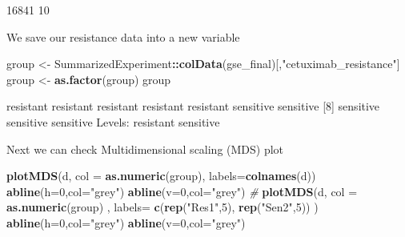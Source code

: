 \documentclass[
]{article}
\newenvironment{Shaded}{\begin{snugshade}}{\end{snugshade}}
\newcommand{\AttributeTok}[1]{\textcolor[rgb]{0.13,0.29,0.53}{#1}}
\newcommand{\CommentTok}[1]{\textcolor[rgb]{0.56,0.35,0.01}{\textit{#1}}}
\newcommand{\DecValTok}[1]{\textcolor[rgb]{0.00,0.00,0.81}{#1}}
\newcommand{\FunctionTok}[1]{\textcolor[rgb]{0.13,0.29,0.53}{\textbf{#1}}}
\newcommand{\NormalTok}[1]{#1}
\newcommand{\OtherTok}[1]{\textcolor[rgb]{0.56,0.35,0.01}{#1}}
\newcommand{\SpecialCharTok}[1]{\textcolor[rgb]{0.81,0.36,0.00}{\textbf{#1}}}
\newcommand{\StringTok}[1]{\textcolor[rgb]{0.31,0.60,0.02}{#1}}
\begin{document}
\begin{Shaded}
\begin{Highlighting}[]
\NormalTok{[1] 16841    10}
\end{Highlighting}
\end{Shaded}

We save our resistance data into a new variable

\begin{Shaded}
\begin{Highlighting}[]
\NormalTok{group }\OtherTok{\textless{}{-}}\NormalTok{ SummarizedExperiment}\SpecialCharTok{::}\FunctionTok{colData}\NormalTok{(gse\_final)[,}\StringTok{"cetuximab\_resistance"}\NormalTok{]}
\NormalTok{group }\OtherTok{\textless{}{-}} \FunctionTok{as.factor}\NormalTok{(group)}
\NormalTok{group}
\end{Highlighting}
\end{Shaded}

\begin{Shaded}
\begin{Highlighting}[]
\NormalTok{ [1] resistant resistant resistant resistant resistant sensitive sensitive}
\NormalTok{ [8] sensitive sensitive sensitive}
\NormalTok{Levels: resistant sensitive}
\end{Highlighting}
\end{Shaded}

Next we can check Multidimensional scaling (MDS) plot

\begin{Shaded}
\begin{Highlighting}[]
\FunctionTok{plotMDS}\NormalTok{(d, }\AttributeTok{col =} \FunctionTok{as.numeric}\NormalTok{(group), }\AttributeTok{labels=}\FunctionTok{colnames}\NormalTok{(d))}
\FunctionTok{abline}\NormalTok{(}\AttributeTok{h=}\DecValTok{0}\NormalTok{,}\AttributeTok{col=}\StringTok{"grey"}\NormalTok{)}
\FunctionTok{abline}\NormalTok{(}\AttributeTok{v=}\DecValTok{0}\NormalTok{,}\AttributeTok{col=}\StringTok{"grey"}\NormalTok{)}
\CommentTok{\#}
\FunctionTok{plotMDS}\NormalTok{(d, }\AttributeTok{col =} \FunctionTok{as.numeric}\NormalTok{(group) , }\AttributeTok{labels=} \FunctionTok{c}\NormalTok{(}\FunctionTok{rep}\NormalTok{(}\StringTok{"Res1"}\NormalTok{,}\DecValTok{5}\NormalTok{), }\FunctionTok{rep}\NormalTok{(}\StringTok{"Sen2"}\NormalTok{,}\DecValTok{5}\NormalTok{)) )}
\FunctionTok{abline}\NormalTok{(}\AttributeTok{h=}\DecValTok{0}\NormalTok{,}\AttributeTok{col=}\StringTok{"grey"}\NormalTok{)}
\FunctionTok{abline}\NormalTok{(}\AttributeTok{v=}\DecValTok{0}\NormalTok{,}\AttributeTok{col=}\StringTok{"grey"}\NormalTok{)}
\end{Highlighting}
\end{Shaded}
\end{document}
